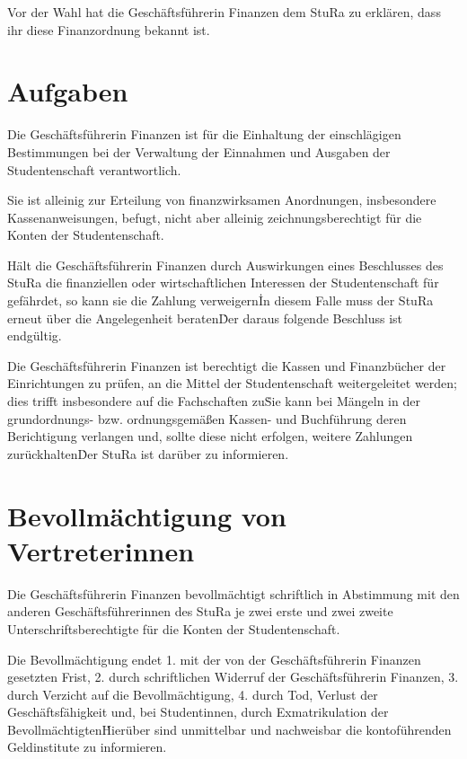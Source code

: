 \Abs \Satz Vor der Wahl hat die Geschäftsführerin Finanzen dem StuRa zu erklären, dass ihr diese Finanzordnung bekannt ist.



\section{Aufgaben}

\Abs \Satz Die Geschäftsführerin Finanzen ist für die Einhaltung der einschlägigen Bestimmungen bei der Verwaltung der Einnahmen und Ausgaben der Studentenschaft verantwortlich.

\Abs \Satz Sie ist alleinig zur Erteilung von finanzwirksamen Anordnungen, insbesondere Kassenanweisungen, befugt, nicht aber alleinig zeichnungsberechtigt für die Konten der Studentenschaft.

\Abs \Satz Hält die Geschäftsführerin Finanzen durch Auswirkungen eines Beschlusses des StuRa die finanziellen oder wirtschaftlichen Interessen der Studentenschaft für gefährdet, so kann sie die Zahlung verweigern\. In diesem Falle muss der StuRa erneut über die Angelegenheit beraten\. Der daraus folgende Beschluss ist endgültig.

\Abs \Satz Die Geschäftsführerin Finanzen ist berechtigt die Kassen und Finanzbücher der Einrichtungen zu prüfen, an die Mittel der Studentenschaft weitergeleitet werden; dies trifft insbesondere auf die Fachschaften zu\. Sie kann bei Mängeln in der grundordnungs- bzw. ordnungsgemäßen Kassen- und Buchführung deren Berichtigung verlangen und, sollte diese nicht erfolgen, weitere Zahlungen zurückhalten\. Der StuRa ist darüber zu informieren.



\section{Bevollmächtigung von Vertreterinnen}

\Abs \Satz Die Geschäftsführerin Finanzen bevollmächtigt schriftlich in Abstimmung mit den anderen Geschäftsführerinnen des StuRa je zwei erste und zwei zweite Unterschriftsberechtigte für die Konten der Studentenschaft.

\Abs \Satz Die Bevollmächtigung endet
1. mit der von der Geschäftsführerin Finanzen gesetzten Frist,
2. durch schriftlichen Widerruf der Geschäftsführerin Finanzen,
3. durch Verzicht auf die Bevollmächtigung,
4. durch Tod, Verlust der Geschäftsfähigkeit und, bei Studentinnen, durch Exmatrikulation der Bevollmächtigten\. Hierüber sind unmittelbar und nachweisbar die kontoführenden Geldinstitute zu informieren.

